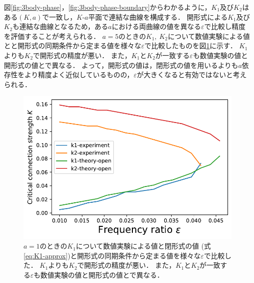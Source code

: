 \documentclass[../main]{subfiles}
\begin{document}
図\ref{fig:3body-phase}，\ref{fig:3body-phase-boundary}からわかるように，$K_1$及び$K_2$はある$(K,a)$で一致し，$K$-$a$平面で連結な曲線を構成する．
開形式による$K_1$及び$K_2$も連結な曲線となるため，ある$a$における両曲線の値を異なる$\varepsilon$で比較し精度を評価することが考えられる．
$a=5$のときの$K_1,\ K_2$について数値実験による値とと開形式の同期条件から定まる値を様々な$\varepsilon$で比較したものを図\ref{fig:k1k2-compare}に示す．
$K_1$よりも$K_2$で開形式の精度が悪い．
また，$K_1$と$K_2$が一致する$\varepsilon$も数値実験の値と開形式の値とで異なる．
よって，開形式の値は，閉形式の値を用いるよりも$a$依存性をより精度よく近似しているものの，$\varepsilon$が大きくなると有効ではないと考えられる．
\begin{figure}[tbp]
\centering
\includegraphics[width=135mm]{./images/k1k2-compare-open.pdf}
\centering
\caption{$a=1$のときの$K_1$について数値実験による値と閉形式の値 (式\eqref{eq:K1-approx})と開形式の同期条件から定まる値を様々な$\varepsilon$で比較した．
$K_1$よりも$K_2$で開形式の精度が悪い．
また，$K_1$と$K_2$が一致する$\varepsilon$も数値実験の値と開形式の値とで異なる．}
\label{fig:k1k2-compare}
\end{figure}
\end{document}
